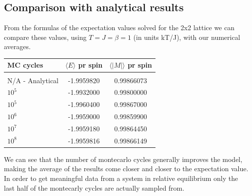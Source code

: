 \documentclass[a4paper, 12pt]{article}
\newcommand{\expect}[1]{\langle #1 \rangle}
\begin{document}
{\subsection{Comparison with analytical results}
	From the formulas of the expectation values solved for the 2x2 lattice we can compare these values, using $T=J=\beta=1$ (in units kT/J), with our numerical averages.
	\begin{center}
	\begin{tabular} {l | c | c }
		MC cycles & 	$\expect{E}$ pr spin & $\expect{|M|}$ pr spin \\ \hline \\
		N/A - Analytical & -1.9959820 & 0.99866073 \\
		$10^5$ & -1.9932000 & 0.99800000\\
		$10^5$ & -1.9960400 & 0.99867000\\
		$10^6$ & -1.9959000 & 0.99859900\\
		$10^7$ & -1.9959180 & 0.99864450\\
		$10^8$ & -1.9959816 & 0.99866149
	\end{tabular}
	\end{center}
	We can see that the number of montecarlo cycles generally improves the model, making the average of the results come closer and closer to the expectation value. In order to get meaningful data from a system in relative equilibrium only the last half of the montecarly cycles are actually sampled from.

}
\end{document}

